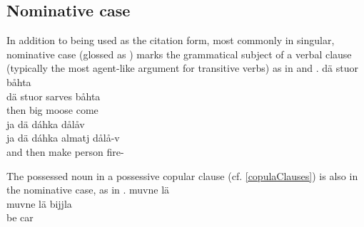 \subsection{Nominative case}\label{nominative}
In addition to being used as the citation form, most commonly in singular, nominative case (glossed as \NOMs) marks the grammatical subject of a verbal clause (typically the most agent-like argument for transitive verbs) 
as in  and %
. %
\ea\label{nom1}
\glll dä stuor  båhta\\ %
	dä stuor sarves båhta\\
	then big moose\BS{} come\BS{}\\\nopagebreak
{} 
\z
\ea\label{nom2}
\glll	ja dä dáhka  dålåv\\ %
	ja dä dáhka almatj dålå-v\\
	and then make\BS{} person\BS{} fire-\\\nopagebreak
{} 
\z

The possessed noun in a possessive copular clause (cf. \ref{copulaClauses}) is also in the nominative case, as in .
\ea\label{nom3}
\glll muvne lä \\ %
	muvne lä bijjla\\
	 be\BS{} car\BS{}\\\nopagebreak
{} 
\z


